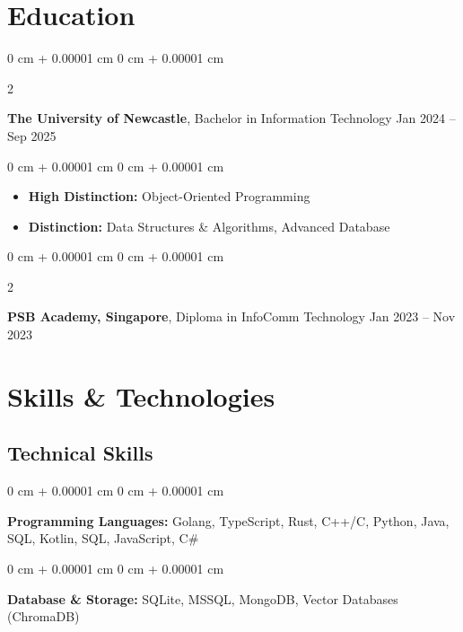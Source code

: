 \documentclass[10pt, letterpaper]{article}
\newenvironment{highlights}{
    \begin{itemize}[
        topsep=0.10 cm,
        parsep=0.10 cm,
        partopsep=0pt,
        itemsep=0pt,
        leftmargin=0 cm + 10pt
    ]
}{
    \end{itemize}
} %
\newenvironment{onecolentry}{
    \begin{adjustwidth}{
        0 cm + 0.00001 cm
    }{
        0 cm + 0.00001 cm
    }
}{
    \end{adjustwidth}
} %
\newenvironment{twocolentry}[2][]{
    \onecolentry
    \def\secondColumn{#2}
    \setcolumnwidth{\fill, 4.5 cm}
    \begin{paracol}{2}
}{
    \switchcolumn \raggedleft \secondColumn
    \end{paracol}
    \endonecolentry
} %
\begin{document}
    \section{Education}
        \begin{twocolentry}{
            Jan 2024 – Sep 2025
        }
        \textbf{The University of Newcastle}, Bachelor in Information Technology\end{twocolentry}
        \vspace{0.10 cm}
        \begin{onecolentry}
            \begin{highlights}
                \item \textbf{High Distinction:} Object-Oriented Programming
            \end{highlights}
            \begin{highlights}
                \item \textbf{Distinction:} Data Structures \& Algorithms, Advanced Database
            \end{highlights}
        \end{onecolentry}

        \vspace{0.20 cm}
        \begin{twocolentry}{
                Jan 2023 – Nov 2023
            }
            \textbf{PSB Academy, Singapore}, Diploma in InfoComm Technology\end{twocolentry}


        \section{Skills \& Technologies}
        
        \subsection*{Technical Skills}
        \begin{onecolentry}
            \textbf{Programming Languages:} Golang, TypeScript, Rust, C++/C, Python, Java, SQL, Kotlin, SQL, JavaScript, C\# 
        \end{onecolentry}
        
        \vspace{0.1 cm}
        
        \begin{onecolentry}
            \textbf{Database \& Storage:} SQLite, MSSQL, MongoDB, Vector Databases (ChromaDB)
        \end{onecolentry}
        
\end{document}
